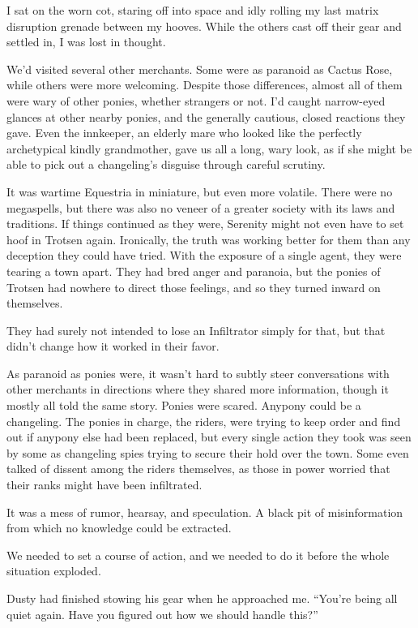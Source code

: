 I sat on the worn cot, staring off into space and idly rolling my last matrix disruption grenade between my hooves. While the others cast off their gear and settled in, I was lost in thought.

We’d visited several other merchants. Some were as paranoid as Cactus Rose, while others were more welcoming. Despite those differences, almost all of them were wary of other ponies, whether strangers or not. I’d caught narrow-eyed glances at other nearby ponies, and the generally cautious, closed reactions they gave. Even the innkeeper, an elderly mare who looked like the perfectly archetypical kindly grandmother, gave us all a long, wary look, as if she might be able to pick out a changeling’s disguise through careful scrutiny.

It was wartime Equestria in miniature, but even more volatile. There were no megaspells, but there was also no veneer of a greater society with its laws and traditions. If things continued as they were, Serenity might not even have to set hoof in Trotsen again. Ironically, the truth was working better for them than any deception they could have tried. With the exposure of a single agent, they were tearing a town apart. They had bred anger and paranoia, but the ponies of Trotsen had nowhere to direct those feelings, and so they turned inward on themselves.

They had surely not intended to lose an Infiltrator simply for that, but that didn’t change how it worked in their favor.

As paranoid as ponies were, it wasn’t hard to subtly steer conversations with other merchants in directions where they shared more information, though it mostly all told the same story. Ponies were scared. Anypony could be a changeling. The ponies in charge, the riders, were trying to keep order and find out if anypony else had been replaced, but every single action they took was seen by some as changeling spies trying to secure their hold over the town. Some even talked of dissent among the riders themselves, as those in power worried that their ranks might have been infiltrated.

It was a mess of rumor, hearsay, and speculation. A black pit of misinformation from which no knowledge could be extracted.

We needed to set a course of action, and we needed to do it before the whole situation exploded.

Dusty had finished stowing his gear when he approached me. “You’re being all quiet again. Have you figured out how we should handle this?”

